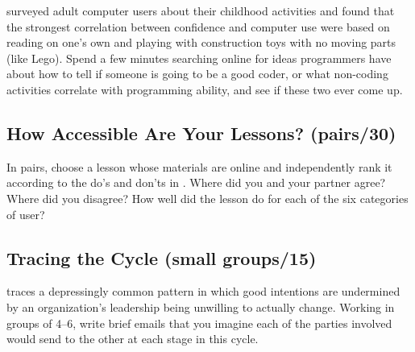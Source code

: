 \cite{Cutt2017} surveyed adult computer users about their childhood
activities and found that the strongest correlation between confidence
and computer use were based on reading on one's own and playing with
construction toys with no moving parts (like Lego). Spend a few minutes
searching online for ideas programmers have about how to tell if someone
is going to be a good coder, or what non-coding activities correlate
with programming ability, and see if these two ever come up.

\subsection*{How Accessible Are Your Lessons? (pairs/30)}

In pairs, choose a lesson whose materials are online and independently
rank it according to the do's and don'ts in . Where did you and your partner
agree? Where did you disagree? How well did the lesson do for each of
the six categories of user?

\subsection*{Tracing the Cycle (small groups/15)}

\cite{Coco2018} traces a depressingly common pattern in which good
intentions are undermined by an organization's leadership being
unwilling to actually change. Working in groups of 4--6, write brief
emails that you imagine each of the parties involved would send to the
other at each stage in this cycle.
